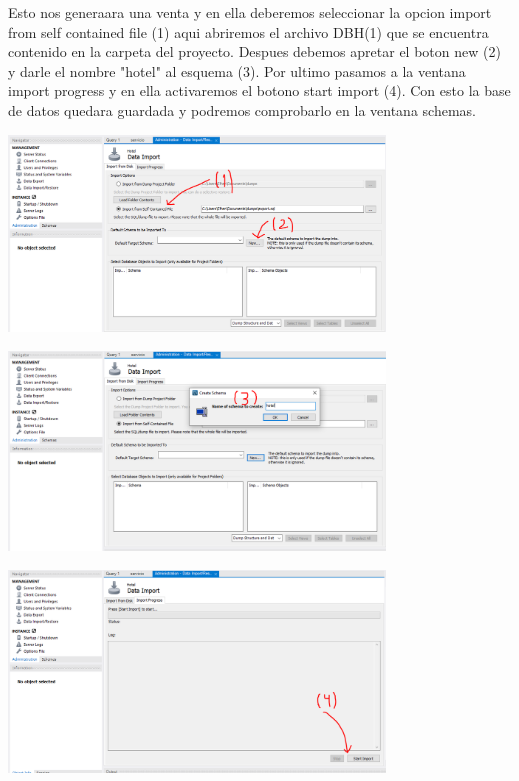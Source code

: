 \documentclass[12pt]{article}
\begin{document}
\begin{flushleft}
\textsf{Esto nos generaara una venta y en ella deberemos seleccionar la opcion import from self contained file (1) aqui abriremos el archivo DBH(1) que se encuentra contenido en la carpeta del proyecto. Despues debemos apretar el boton new (2) y darle el nombre "hotel" al esquema (3). Por ultimo pasamos a la ventana import progress y en ella activaremos el botono start import (4). Con esto la base de datos quedara guardada y podremos comprobarlo en la ventana schemas.}

\vspace{0.5cm}
\begin{center}
\includegraphics[width=10cm]{Johan3.png} 
\end{center}

\vspace{0.5cm}
\begin{center}
\includegraphics[width=10cm]{Johan4.png} 
\end{center}

\vspace{0.5cm}
\begin{center}
\includegraphics[width=10cm]{Johan5.png} 
\end{center}
\vspace{0.5cm}


\end{flushleft}
\end{document}
